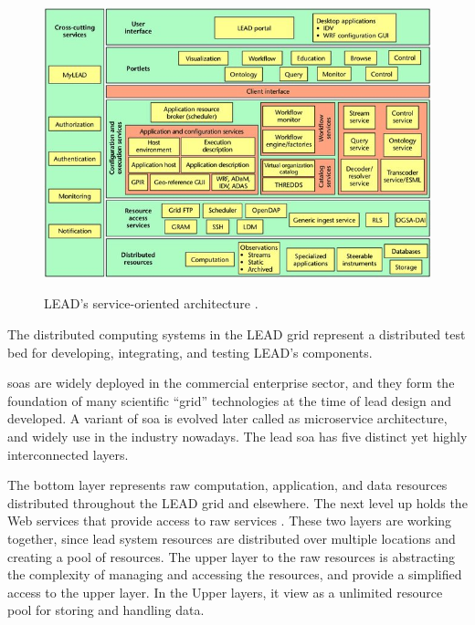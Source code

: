 \begin{figure}[htp]
    \centering
    \includegraphics[width=1\textwidth]{lead/LEADs-service-oriented-architecture-A-wide-variety-of-services-and-resources-grouped_W640.jpg}\\
    \caption{LEAD’s service-oriented architecture %
    \cite{Droegemeier2005Service-OrientedWeather}.}
    \label{fi:lead_soa}
\end{figure}

The distributed computing systems in the LEAD grid represent a distributed test bed for developing, integrating, and testing LEAD’s components.

\acrshort{soa}s are widely deployed in the commercial enterprise sector, and they form the foundation of many scientific “grid” technologies at the time of \acrshort{lead} design and developed. A variant of \acrshort{soa} is evolved later called as microservice architecture, and widely use in the industry nowadays. The \acrshort{lead} \acrshort{soa} has five distinct yet highly interconnected layers. 

The bottom layer represents raw computation, application, and data resources distributed throughout the LEAD grid and elsewhere. The next level up holds the Web services that provide access to raw services \cite{Droegemeier2005Service-OrientedWeather}. These two layers are working together, since \acrshort{lead} system resources are distributed over multiple locations and creating a pool of resources. The upper layer to the raw resources is abstracting the complexity of managing and accessing the resources, and provide a simplified access to the upper layer. In the Upper layers, it view as a unlimited resource pool for storing and handling data.


